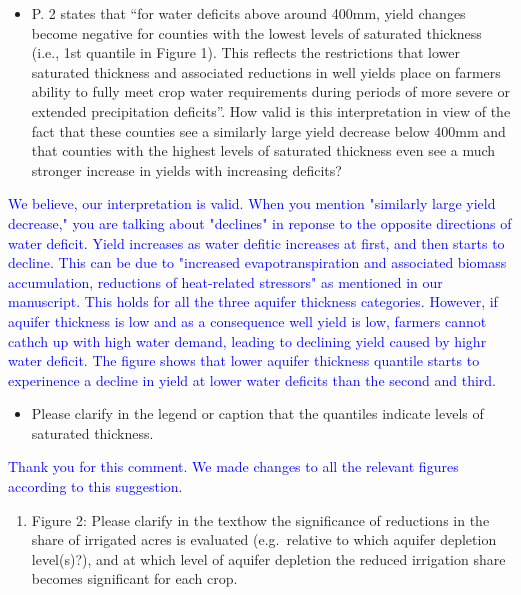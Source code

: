 \documentclass[
]{article}
\providecommand{\tightlist}{%
  \setlength{\itemsep}{0pt}\setlength{\parskip}{0pt}}
\begin{document}
\begin{itemize}
\tightlist
\item
  P. 2 states that ``for water deficits above around 400mm, yield
  changes become negative for counties with the lowest levels of
  saturated thickness (i.e., 1st quantile in Figure 1). This reflects
  the restrictions that lower saturated thickness and associated
  reductions in well yields place on farmers ability to fully meet crop
  water requirements during periods of more severe or extended
  precipitation deficits''. How valid is this interpretation in view of
  the fact that these counties see a similarly large yield decrease
  below 400mm and that counties with the highest levels of saturated
  thickness even see a much stronger increase in yields with increasing
  deficits?
\end{itemize}

\textcolor{blue}{We believe, our interpretation is valid. When you mention "similarly large yield decrease," you are talking about "declines" in reponse to the opposite directions of water deficit. Yield increases as water defitic increases at first, and then starts to decline. This can be due to "increased evapotranspiration and associated biomass accumulation, reductions of heat-related stressors" as mentioned in our manuscript. This holds for all the three aquifer thickness categories. However, if aquifer thickness is low and as a consequence well yield is low, farmers cannot cathch up with high water demand, leading to declining yield caused by highr water deficit. The figure shows that lower aquifer thickness quantile starts to experinence a decline in yield at lower water deficits than the second and third.}

\begin{itemize}
\tightlist
\item
  Please clarify in the legend or caption that the quantiles indicate
  levels of saturated thickness.
\end{itemize}

\textcolor{blue}{Thank you for this comment. We made changes to all the relevant figures according to this suggestion.}

\begin{enumerate}
\def\labelenumi{\arabic{enumi}.}
\setcounter{enumi}{2}
\tightlist
\item
  Figure 2: Please clarify in the texthow the significance of reductions
  in the share of irrigated acres is evaluated (e.g.~relative to which
  aquifer depletion level(s)?), and at which level of aquifer depletion
  the reduced irrigation share becomes significant for each crop.
\end{enumerate}
\end{document}
